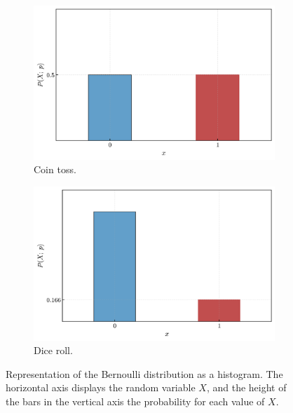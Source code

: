 \documentclass{book}
\begin{document}
\begin{figure}[ht]
    \centering
    \begin{subfigure}[b]{0.48\textwidth}
        \centering
        \includegraphics[width=\textwidth, height=0.7\textwidth]{figures/chapter2/bernoulli_1.png}
        \caption{Coin toss.}
        \label{fig:bernoulli1}
    \end{subfigure}
    \hfill
    \begin{subfigure}[b]{0.48\textwidth}
        \centering
        \includegraphics[width=\textwidth, height=0.7\textwidth]{figures/chapter2/bernoulli_2.png}
        \caption{Dice roll.}
        \label{fig:bernoulli2}
    \end{subfigure}
    \caption{Representation of the Bernoulli distribution as a histogram. The horizontal axis displays the random variable $X$, and the height of the bars in the vertical axis the probability for each value of $X$.}
    \label{fig:bernoulli_comparison}
\end{figure}
\end{document}
